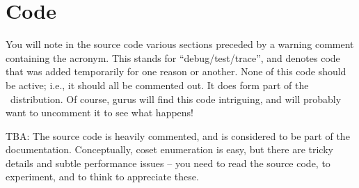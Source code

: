 \section{Code}

You will note in the source code various sections preceded by a warning
  comment containing the  acronym.
This stands for ``debug/test/trace''\kern-2pt, and denotes code that was
  added temporarily for one reason or another.
None of this code should be active; i.e., it should all be commented out.
It does  form part of the \ace\ distribution.
Of course, gurus will find this code intriguing, and will probably want
  to uncomment it to see what happens!

TBA:
The source code is heavily commented, and is considered to be part of the
  documentation.
Conceptually, coset enumeration is easy, but there are tricky details and
  subtle performance issues -- you need to read the source code, to
  experiment, and to think to appreciate these.

